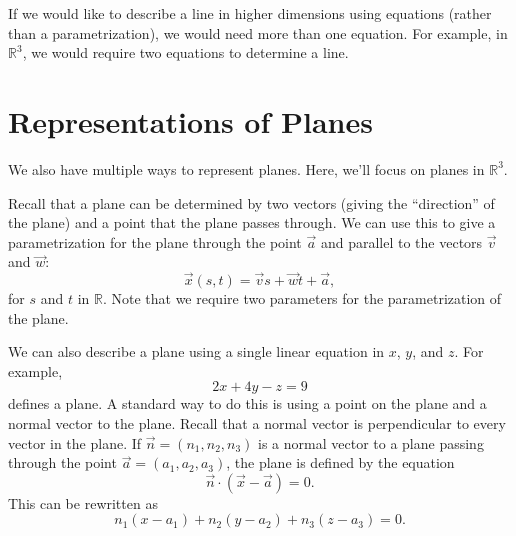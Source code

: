 \documentclass{ximera}
\begin{document}
 If we would like to describe a line in higher dimensions using equations (rather than a parametrization), we would need more than one equation. For example, in $\mathbb{R}^3$, we would require two equations to determine a line.
 
 \section*{Representations of Planes}
 
 We also have multiple ways to represent planes. Here, we'll focus on planes in $\mathbb{R}^3$.
 
 Recall that a plane can be determined by two vectors (giving the ``direction'' of the plane) and a point that the plane passes through. We can use this to give a parametrization for the plane through the point $\vec{a}$ and parallel to the vectors $\vec{v}$ and $\vec{w}$:
 \[
 \vec{x}(s,t) = \vec{v}s+\vec{w}t + \vec{a},
 \]
 for $s$ and $t$ in $\mathbb{R}$. Note that we require two parameters for the parametrization of the plane.

We can also describe a plane using a single linear equation in $x$, $y$, and $z$. For example,
\[
2x+4y-z=9
\]
defines a plane. A standard way to do this is using a point on the plane and a normal vector to the plane. Recall that a normal vector is perpendicular to every vector in the plane. If $\vec{n}=(n_1,n_2,n_3)$ is a normal vector to a plane passing through the point $\vec{a}=(a_1,a_2,a_3)$, the plane is defined by the equation
\[
\vec{n}\cdot(\vec{x}-\vec{a})=0.
\]
This can be rewritten as
\[
n_1(x-a_1)+n_2(y-a_2)+n_3(z-a_3)=0.
\]
\end{document}
